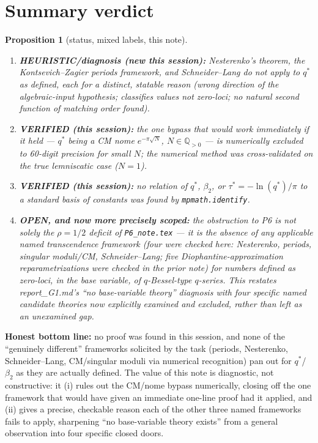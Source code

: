 \documentclass[11pt]{article}
\newtheorem{proposition}{Proposition}
\begin{document}
\section{Summary verdict}

\begin{proposition}[status, mixed labels, this note]
\begin{enumerate}
\item[(a)] \textbf{HEURISTIC/diagnosis (new this session):} Nesterenko's theorem, the
Kontsevich--Zagier periods framework, and Schneider--Lang do not apply to $q^\ast$ as defined,
each for a distinct, statable reason (wrong direction of the algebraic-input hypothesis;
classifies values not zero-loci; no natural second function of matching order found).
\item[(b)] \textbf{VERIFIED (this session):} the one bypass that would work immediately if it
held --- $q^\ast$ being a CM nome $e^{-\pi\sqrt N}$, $N\in\mathbb Q_{>0}$ --- is numerically
excluded to 60-digit precision for small $N$; the numerical method was cross-validated on the
true lemniscatic case ($N=1$).
\item[(c)] \textbf{VERIFIED (this session):} no relation of $q^\ast$, $\beta_2$, or
$\tau^\ast=-\ln(q^\ast)/\pi$ to a standard basis of constants was found by \texttt{mpmath.identify}.
\item[(d)] \textbf{OPEN, and now more precisely scoped:} the obstruction to P6 is not solely the
$\rho=1/2$ deficit of \texttt{P6\_note.tex} --- it is the absence of \emph{any} applicable named
transcendence framework (four were checked here: Nesterenko, periods, singular moduli/CM,
Schneider--Lang; five Diophantine-approximation reparametrizations were checked in the prior
note) for numbers defined as zero-loci, in the base variable, of $q$-Bessel-type $q$-series. This
restates report\_G1.md's ``no base-variable theory'' diagnosis with four specific named
candidate theories now explicitly examined and excluded, rather than left as an unexamined gap.
\end{enumerate}
\end{proposition}

\textbf{Honest bottom line:} no proof was found in this session, and none of the ``genuinely
different'' frameworks solicited by the task (periods, Nesterenko, Schneider--Lang, CM/singular
moduli via numerical recognition) pan out for $q^\ast$/$\beta_2$ as they are actually defined.
The value of this note is diagnostic, not constructive: it (i) rules out the CM/nome bypass
numerically, closing off the one framework that would have given an immediate one-line proof
had it applied, and (ii) gives a precise, checkable reason each of the other three named
frameworks fails to apply, sharpening ``no base-variable theory exists'' from a general
observation into four specific closed doors.
\end{document}
